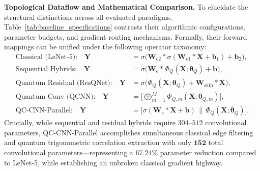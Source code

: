 \documentclass[pdflatex,sn-mathphys-num]{sn-jnl}%
\theoremstyle{thmstyleone}%
\theoremstyle{thmstyletwo}%
\theoremstyle{thmstylethree}%
\begin{document}
\textbf{Topological Dataflow and Mathematical Comparison.} 
To elucidate the structural distinctions across all evaluated paradigms, Table~\ref{tab:baseline_specifications} contrasts their algorithmic configurations, parameter budgets, and gradient routing mechanisms. Formally, their forward mappings can be unified under the following operator taxonomy:
\begin{align}
\text{Classical (LeNet-5):} \quad \mathbf{Y} &= \sigma\Big(\mathbf{W}_{\mathrm{c}2} * \sigma(\mathbf{W}_{\mathrm{c}1} * \mathbf{X} + \mathbf{b}_1) + \mathbf{b}_2\Big), \nonumber \\
\text{Sequential Hybrids:} \quad \mathbf{Y} &= \sigma\Big(\mathbf{W}_{\mathrm{c}} * \Phi_Q(\mathbf{X}; \boldsymbol{\theta}_Q) + \mathbf{b}\Big), \nonumber \\
\text{Quantum Residual (ResQNet):} \quad \mathbf{Y} &= \sigma\Big(\Phi_Q(\mathbf{X}; \boldsymbol{\theta}_Q) + \mathbf{W}_{\mathrm{skip}} * \mathbf{X}\Big), \nonumber \\
\text{Quantum Conv (QCNN):} \quad \mathbf{Y} &= \Big[ \bigoplus_{m=1}^M \Phi_{Q, m}(\mathbf{X}; \boldsymbol{\theta}_{Q, m}) \Big], \nonumber \\
\text{QC-CNN-Parallel:} \quad \mathbf{Y} &= \Big[ \sigma(\mathbf{W}_{\mathrm{c}} * \mathbf{X} + \mathbf{b}) \,\|\, \Phi_Q(\mathbf{X}; \boldsymbol{\theta}_Q) \Big].
\label{eq:architectural_taxonomy_equations}
\end{align}
Crucially, while sequential and residual hybrids require $304$--$512$ convolutional parameters, QC-CNN-Parallel accomplishes simultaneous classical edge filtering and quantum trigonometric correlation extraction with only $\mathbf{152}$ total convolutional parameters---representing a $\mathbf{67.24\%}$ parameter reduction compared to LeNet-5, while establishing an unbroken classical gradient highway.
\end{document}
